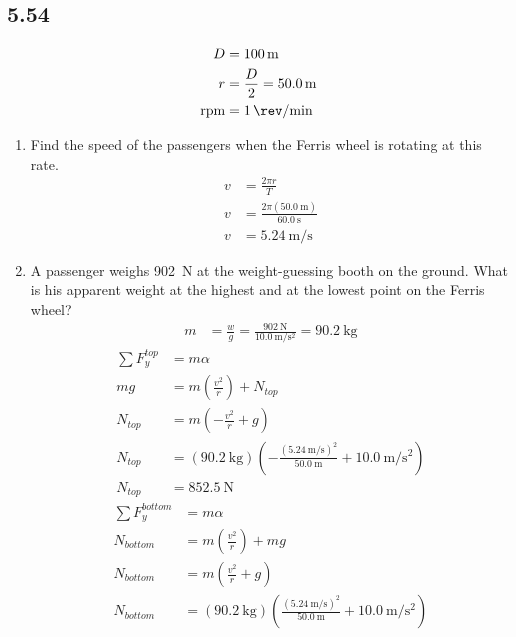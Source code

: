\documentclass{article}
\begin{document}
\subsection{5.54}

\begin{align*}
	D & = \SI{100}{\meter} \\
	r & = \frac{D}{2} = \SI{50.0}{\meter} \\
	\text{rpm} & = \SI{1}{\rev \per \minute}
\end{align*}
\begin{enumerate}[label = \textbf{(\alph*)}]
	\item Find the speed of the passengers when the Ferris wheel is rotating at this rate.
		\begin{align*}
			v & = \frac{ 2\pi r }{ T } \\
			v & = \frac{ 2\pi (\SI{50.0}{\meter}) }{ \SI{60.0}{\second} } \\
			v & = \SI{5.24}{\meter \per \second}
		\end{align*}
	\item A passenger weighs \SI{902}{\newton} at the weight-guessing booth on the ground. What is his apparent weight at the highest and at the lowest point on the Ferris wheel?
		\begin{align*}
			m & = \frac{w}{g} = \frac{ \SI{902}{\newton} }{ \SI{10.0}{\meter \per \second \squared} } = \SI{90.2}{\kilogram}
		\end{align*}
		\begin{align*}
			\sum F_y^{top} & = m\alpha \\
			mg & = m \left( \frac{ v^2 }{ r } \right) + N_{top} \\
			N_{top} & = m \left( -\frac{ v^2 }{ r } + g \right) \\
			N_{top} & = (\SI{90.2}{\kilogram}) \left( -\frac{ (\SI{5.24}{\meter \per \second})^2 }{ \SI{50.0}{\meter} } + \SI{10.0}{\meter \per \second \squared} \right) \\
			N_{top} & = \SI{852.5}{\newton}
		\end{align*}
		\begin{align*}
			\sum F_y^{bottom} & = m\alpha \\
			N_{bottom} & = m \left( \frac{ v^2 }{ r } \right) + mg \\
			N_{bottom} & = m \left( \frac{ v^2 }{ r } + g \right) \\
			N_{bottom} & = (\SI{90.2}{\kilogram}) \left( \frac{ (\SI{5.24}{\meter \per \second})^2 }{ \SI{50.0}{\meter} } + \SI{10.0}{\meter \per \second \squared} \right) \\

\end{align*}
\end{enumerate}
\end{document}

